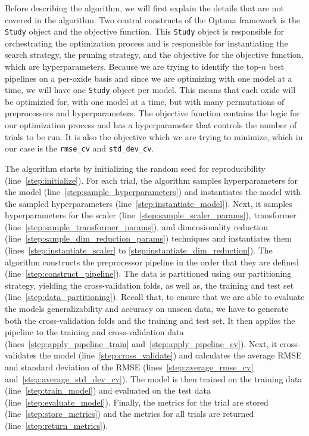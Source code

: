 Before describing the algorithm, we will first explain the details that are not covered in the algorithm.
Two central constructs of the Optuna framework is the \texttt{Study} object and the objective function.
This \texttt{Study} object is responsible for orchestrating the optimization process and is responsible for instantiating the search strategy, the pruning strategy, and the objective for the objective function, which are hyperparameters.
Because we are trying to identify the top-$n$ best pipelines on a per-oxide basis and since we are optimizing with one model at a time, we will have one \texttt{Study} object per model.
This means that each oxide will be optimizied for, with one model at a time, but with many permutations of preprocessors and hyperparameters. 
The objective function contains the logic for our optimization process and has a hyperparameter that controls the number of trials to be run.
It is also the objective which we are trying to minimize, which in our case is the \texttt{rmse\_cv} and \texttt{std\_dev\_cv}.

The algorithm starts by initializing the random seed for reproducibility (line~\ref{step:initialize}).
For each trial, the algorithm samples hyperparameters for the model (line~\ref{step:sample_hyperparameters}) and instantiates the model with the sampled hyperparameters (line~\ref{step:instantiate_model}).
Next, it samples hyperparameters for the scaler (line~\ref{step:sample_scaler_params}), transformer (line~\ref{step:sample_transformer_params}), and dimensionality reduction (line~\ref{step:sample_dim_reduction_params}) techniques and instantiates them (lines~\ref{step:instantiate_scaler} to \ref{step:instantiate_dim_reduction}).
The algorithm constructs the preprocessor pipeline in the order that they are defined (line~\ref{step:construct_pipeline}).
The data is partitioned using our partitioning strategy, yielding the cross-validation folds, as well as, the training and test set (line~\ref{step:data_partitioning}).
Recall that, to ensure that we are able to evaluate the models generalizability and accuracy on unseen data, we have to generate both the cross-validation folds and the training and test set.
It then applies the pipeline to the training and cross-validation data (lines~\ref{step:apply_pipeline_train} and~\ref{step:apply_pipeline_cv}).
Next, it cross-validates the model (line~\ref{step:cross_validate}) and calculates the average RMSE and standard deviation of the RMSE (lines~\ref{step:average_rmse_cv} and~\ref{step:average_std_dev_cv}).
The model is then trained on the training data (line~\ref{step:train_model}) and evaluated on the test data (line~\ref{step:evaluate_model}).
Finally, the metrics for the trial are stored (line~\ref{step:store_metrics}) and the metrics for all trials are returned (line~\ref{step:return_metrics}).
